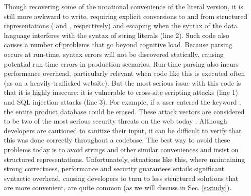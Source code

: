 Though recovering some of the notational convenience of the literal version, it is still more awkward to write, requiring explicit conversions to and from structured representations ( and , respectively) and escaping when the syntax of the data language interferes with the syntax of string literals (line 2). Such code also causes a number of problems that go beyond cognitive load. Because parsing occurs at run-time, syntax errors will not be discovered statically, causing potential run-time errors  in production scenarios. Run-time parsing also incurs performance overhead, particularly relevant when code like this is executed often (as on a heavily-trafficked website). But the most serious issue with this code is that it is highly insecure: it is vulnerable to cross-site scripting attacks (line 1) and SQL injection attacks (line 3). For example, if a user entered the keyword , the entire product database could be erased. These attack vectors are considered to be two of the most serious security threats on the web today \cite{owasp2013}. Although developers are cautioned to sanitize their input, it can be difficult to verify that this was done correctly throughout a codebase. The best way to avoid these problems today is to avoid strings and other similar conveniences and insist on structured representations. Unfortunately, situations like this, where maintaining strong correctness, performance and security guarantees entails significant syntactic overhead, causing developers to turn to less structured solutions that are more convenient, are quite common (as we will discuss in Sec. \ref{s:study}).

